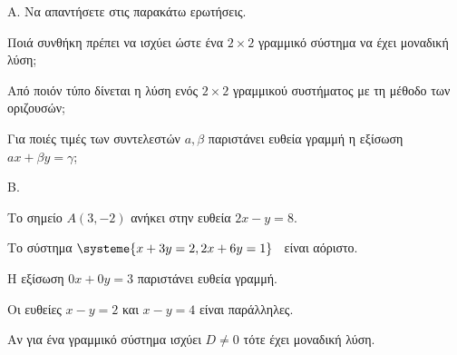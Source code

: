 Α. Να απαντήσετε στις παρακάτω ερωτήσεις.
\begin{rlist}
\item Ποιά συνθήκη πρέπει να ισχύει ώστε ένα $ 2\times2 $ γραμμικό σύστημα να έχει μοναδική λύση;
\item Από ποιόν τύπο δίνεται η λύση ενός $ 2\times2 $ γραμμικού συστήματος με τη μέθοδο των οριζουσών;
\item Για ποιές τιμές των συντελεστών $ a,\beta $ παριστάνει ευθεία γραμμή η εξίσωση $ ax+\beta y=\gamma $;
\end{rlist}
Β. \swstolathos
\begin{rlist}
\item Το σημείο $ A(3,-2) $ ανήκει στην ευθεία $ 2x-y=8 $.
\item Το σύστημα $ \systeme{x+3y=2,2x+6y=1} $ \ είναι αόριστο.
\item Η εξίσωση $ 0x+0y=3 $ παριστάνει ευθεία γραμμή.
\item Οι ευθείες $ x-y=2 $ και $ x-y=4 $ είναι παράλληλες.
\item Αν για ένα γραμμικό σύστημα ισχύει $ D\neq0 $ τότε έχει μοναδική λύση.
\end{rlist}
